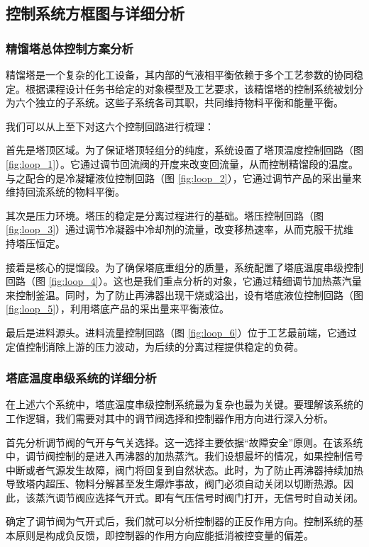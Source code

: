 \documentclass[a4paper,zihao=-4]{article}
\numberwithin{equation}{section}
\numberwithin{figure}{section}
\numberwithin{table}{section}
\begin{document}
\subsection{控制系统方框图与详细分析}

\subsubsection{精馏塔总体控制方案分析}

精馏塔是一个复杂的化工设备，其内部的气液相平衡依赖于多个工艺参数的协同稳定。根据课程设计任务书给定的对象模型及工艺要求，该精馏塔的控制系统被划分为六个独立的子系统。这些子系统各司其职，共同维持物料平衡和能量平衡。

我们可以从上至下对这六个控制回路进行梳理：

首先是塔顶区域。为了保证塔顶轻组分的纯度，系统设置了塔顶温度控制回路（图 \ref{fig:loop_1}）。它通过调节回流阀的开度来改变回流量，从而控制精馏段的温度。与之配合的是冷凝罐液位控制回路（图 \ref{fig:loop_2}），它通过调节产品的采出量来维持回流系统的物料平衡。

其次是压力环境。塔压的稳定是分离过程进行的基础。塔压控制回路（图 \ref{fig:loop_3}）通过调节冷凝器中冷却剂的流量，改变移热速率，从而克服干扰维持塔压恒定。

接着是核心的提馏段。为了确保塔底重组分的质量，系统配置了塔底温度串级控制回路（图 \ref{fig:loop_4}）。这也是我们重点分析的对象，它通过精细调节加热蒸汽量来控制釜温。同时，为了防止再沸器出现干烧或溢出，设有塔底液位控制回路（图 \ref{fig:loop_5}），利用塔底产品的采出量来平衡液位。

最后是进料源头。进料流量控制回路（图 \ref{fig:loop_6}）位于工艺最前端，它通过定值控制消除上游的压力波动，为后续的分离过程提供稳定的负荷。
\subsubsection{塔底温度串级系统的详细分析}

在上述六个系统中，塔底温度串级控制系统最为复杂也最为关键。要理解该系统的工作逻辑，我们需要对其中的调节阀选择和控制器作用方向进行深入分析。

首先分析调节阀的气开与气关选择。这一选择主要依据“故障安全”原则。在该系统中，调节阀控制的是进入再沸器的加热蒸汽。我们设想最坏的情况，如果控制信号中断或者气源发生故障，阀门将回复到自然状态。此时，为了防止再沸器持续加热导致塔内超压、物料分解甚至发生爆炸事故，阀门必须自动关闭以切断热源。因此，该蒸汽调节阀应选择气开式。即有气压信号时阀门打开，无信号时自动关闭。

确定了调节阀为气开式后，我们就可以分析控制器的正反作用方向。控制系统的基本原则是构成负反馈，即控制器的作用方向应能抵消被控变量的偏差。
\end{document}
